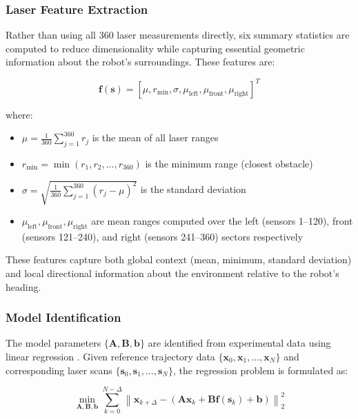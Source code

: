 \documentclass[conference]{IEEEtran}
\begin{document}
\subsubsection{Laser Feature Extraction}

Rather than using all 360 laser measurements directly, six summary statistics are computed to reduce dimensionality while capturing essential geometric information about the robot's surroundings. These features are:

\begin{equation}
    \mathbf{f}(\mathbf{s}) = [\mu, r_{\min}, \sigma, \mu_{\text{left}}, \mu_{\text{front}}, \mu_{\text{right}}]^T
\end{equation}

where:
\begin{itemize}
    \item $\mu = \frac{1}{360}\sum_{j=1}^{360} r_j$ is the mean of all laser ranges
    \item $r_{\min} = \min(r_1, r_2, \ldots, r_{360})$ is the minimum range (closest obstacle)
    \item $\sigma = \sqrt{\frac{1}{360}\sum_{j=1}^{360}(r_j - \mu)^2}$ is the standard deviation
    \item $\mu_{\text{left}}, \mu_{\text{front}}, \mu_{\text{right}}$ are mean ranges computed over the left (sensors 1--120), front (sensors 121--240), and right (sensors 241--360) sectors respectively
\end{itemize}

These features capture both global context (mean, minimum, standard deviation) and local directional information about the environment relative to the robot's heading.

\subsubsection{Model Identification}

The model parameters $\{\mathbf{A}, \mathbf{B}, \mathbf{b}\}$ are identified from experimental data using linear regression \cite{Aguirre2007}. Given reference trajectory data $\{\mathbf{x}_0, \mathbf{x}_1, \ldots, \mathbf{x}_N\}$ and corresponding laser scans $\{\mathbf{s}_0, \mathbf{s}_1, \ldots, \mathbf{s}_N\}$, the regression problem is formulated as:

\begin{equation}
    \min_{\mathbf{A}, \mathbf{B}, \mathbf{b}} \sum_{k=0}^{N-\Delta} \left\| \mathbf{x}_{k+\Delta} - (\mathbf{A} \mathbf{x}_k + \mathbf{B} \mathbf{f}(\mathbf{s}_k) + \mathbf{b}) \right\|_2^2
\end{equation}
\end{document}
